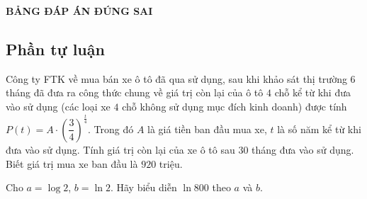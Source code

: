 
\begin{center}
\textbf{\textsf{BẢNG ĐÁP ÁN ĐÚNG SAI}}
\end{center}




\subsection{Phần tự luận}

\hienthiloigiaibt

\begin{bt}%
	Công ty FTK về mua bán xe ô tô đã qua sử dụng, sau khi khảo sát thị trường $6$ tháng đã đưa ra công thức chung về giá trị còn lại của ô tô $4$ chỗ kể từ khi đưa vào sử dụng (các loại xe $4$ chỗ không sử dụng mục đích kinh doanh) được tính $P(t)=A \cdot\left(\dfrac{3}{4}\right)^{\tfrac{t}{4}}$. Trong đó $A$ là giá tiền ban đầu mua xe, $t$ là số năm kể từ khi đưa vào sử dụng. Tính giá trị còn lại của xe ô tô sau $30$ tháng đưa vào sử dụng. Biết giá trị mua xe ban đầu là $920$ triệu.
\end{bt}
\begin{bt}%
	Cho $a=\log 2$, $b=\ln 2$. Hãy biểu diễn $\ln 800$ theo $a$ và $b$.
\end{bt}
